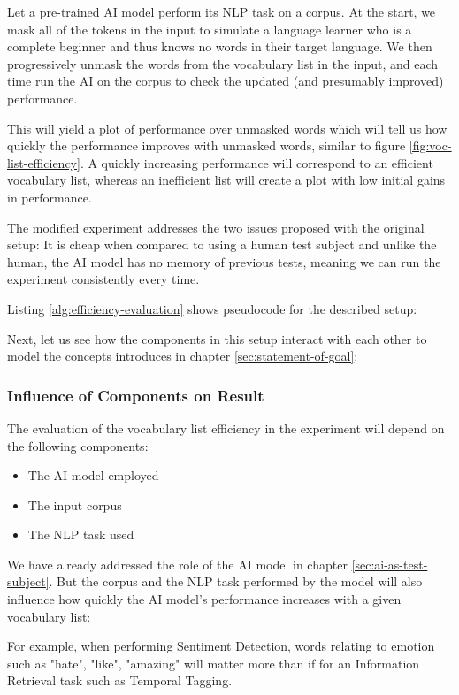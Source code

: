 Let a pre-trained AI model perform its NLP task on a corpus.
At the start, we mask all of the tokens in the input to simulate a language learner who is a complete beginner and thus knows no words in their target language.
We then progressively unmask the words from the vocabulary list in the input, and each time run the AI on the corpus to check the updated (and presumably improved) performance.

This will yield a plot of performance over unmasked words which will tell us how quickly the performance improves with unmasked words, similar to figure \ref{fig:voc-list-efficiency}.
A quickly increasing performance will correspond to an efficient vocabulary list, whereas an inefficient list will create a plot with low initial gains in performance.

The modified experiment addresses the two issues proposed with the original setup:
It is cheap when compared to using a human test subject and unlike the human, the AI model has no memory of previous tests, meaning we can run the experiment consistently every time.


Listing \ref{alg:efficiency-evaluation} shows pseudocode for the described setup:



Next, let us see how the components in this setup interact with each other to model the concepts introduces in chapter \ref{sec:statement-of-goal}:

\subsubsection{Influence of Components on Result}
The evaluation of the vocabulary list efficiency in the experiment will depend on the following components:

\begin{itemize}
	\item The AI model employed
	\item The input corpus
	\item The NLP task used
\end{itemize}

We have already addressed the role of the AI model in chapter \ref{sec:ai-as-test-subject}.
But the corpus and the NLP task performed by the model will also influence how quickly the AI model's performance increases with a given vocabulary list:

For example, when performing Sentiment Detection, words relating to emotion such as "hate", "like", "amazing" will matter more than if for an Information Retrieval task such as Temporal Tagging.


